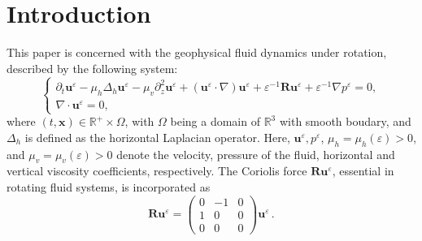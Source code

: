 \documentclass[pdflatex,sn-mathphys-num]{sn-jnl}%
\theoremstyle{thmstyleone}%
\theoremstyle{thmstyletwo}%
\theoremstyle{thmstylethree}%
\theoremstyle{thmstyletwo}
\begin{document}
 




\maketitle
\section{Introduction}\label{sec1}	
This paper is concerned with the  geophysical fluid dynamics under rotation,  described by the following system:
\begin{equation}\label{1.1}
	\begin{cases}
		\partial_t \boldsymbol{u}^\varepsilon-\mu_{h}\Delta_{h} \boldsymbol{u}^\varepsilon-\mu_{v}\partial_z^2 \boldsymbol{u}^\varepsilon+(\boldsymbol{u}^\varepsilon \cdot \nabla)\boldsymbol{u}^\varepsilon+\varepsilon^{-1}\boldsymbol{R}\boldsymbol{u}^\varepsilon+\varepsilon^{-1}\nabla p^\varepsilon=0,\\
		\nabla\cdot \boldsymbol{u}^\varepsilon=0,
	\end{cases}
\end{equation}
where $(t,\boldsymbol x)\in \mathbb{R^+}\times \Omega$, with $\Omega$ being a domain of $\mathbb{R}^3$ with smooth boudary,
and $\Delta_h$ is defined as the horizontal Laplacian operator.
Here, $\boldsymbol{u}^\varepsilon, p^\varepsilon$, $\mu_h=\mu_h(\varepsilon)>0$, and $\mu_v=\mu_v(\varepsilon)>0$ denote the velocity, pressure of the fluid, horizontal and vertical viscosity coefficients, respectively.
The Coriolis force $\boldsymbol{R}\boldsymbol{u}^\varepsilon$, essential in rotating fluid systems, is incorporated as
\begin{equation*}
	\boldsymbol{R}\boldsymbol{u}^\varepsilon=\begin{pmatrix}
		0&-1&0\\
		1&0&0\\
		0&0&0
	\end{pmatrix}\boldsymbol{u}^\varepsilon\,.
\end{equation*}
\end{document}
